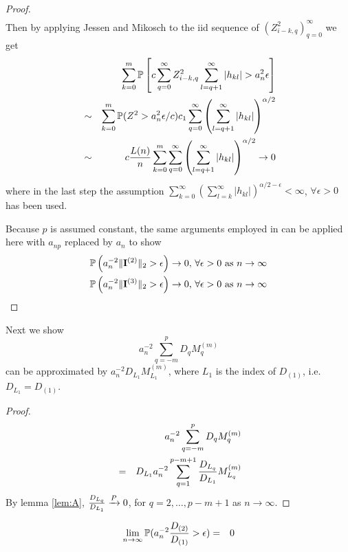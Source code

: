 \documentclass{article}
\begin{document}
\begin{proof}
\begin{eqnarray*}
  \end{eqnarray*}
  Then by applying Jessen and Mikosch \cite{JessenMikosch2006} to the
  iid sequence of $(Z_{i-k, q}^2)_{q=0}^{\infty}$ we get
  \begin{eqnarray*}
    && \sum_{k=0}^m \mathbb{P}\left[c \sum_{q=0}^{\infty} Z_{i-k, q}^2
      \sum_{l=q+1}^\infty |h_{kl}| > a_n^2 \epsilon \right] \\
    &\sim& \sum_{k=0}^m \mathbb{P}(Z^2 > a_n^2 \epsilon/c) c_1
    \sum_{q=0}^{\infty} \left( \sum_{l=q+1}^\infty |h_{kl}|
    \right)^{\alpha/2} \\
    &\sim& c {L(n) \over n} \sum_{k=0}^m \sum_{q=0}^{\infty} \left(
      \sum_{l=q+1}^\infty |h_{kl}| \right)^{\alpha/2} \to 0
  \end{eqnarray*}
  where in the last step the assumption $\sum_{k=0}^{\infty}
  \left(\sum_{l=k}^{\infty} |h_{kl}|\right)^{\alpha/2-\epsilon} <
  \infty$, $\forall \epsilon > 0$ has been used.

  Because $p$ is assumed constant, the same arguments employed in
  \cite{Mikosch2014} can be applied here with $a_{np}$ replaced by
  $a_n$ to show
  \begin{eqnarray*}
    & \mathbb{P}\left(
      a_n^{-2} \|\mathbf{I}^{(2)}\|_2 > \epsilon
    \right) \to 0 \text{, } \forall \epsilon > 0 \text{ as } n \to
    \infty \\
    & \mathbb{P}\left(
      a_n^{-2} \|\mathbf{I}^{(3)}\|_2 > \epsilon
    \right) \to 0 \text{, } \forall \epsilon > 0 \text{ as } n \to \infty
  \end{eqnarray*}
\end{proof}
Next we show
\[
a_n^{-2}\sum_{q=-m}^p D_q M_q^{(m)}
\]
can be approximated by $a_n^{-2} D_{L_1} M_{L_1}^{(m)}$, where $L_1$ is the
index of $D_{(1)}$, i.e. $D_{L_1} = D_{(1)}$.
\begin{proof}
  \begin{eqnarray*}
    && a_n^{-2} \sum_{q=-m}^p D_q M_q^{(m)} \\
    &=& D_{L_1} a_n^{-2} \sum_{q=1}^{p-m+1} {D_{L_q} \over D_{L_1}}
    M_{L_q}^{(m)}
  \end{eqnarray*}
  By lemma \ref{lem:A}, ${D_{L_q} \over D_{L_1}} \xrightarrow{P} 0$,
  for $q = 2, \dots, p-m+1$ as $n \to \infty$.
\end{proof}
\begin{lemma}\label{lem:A}
  \begin{eqnarray*}
    \lim_{n \to \infty} \mathbb{P}(a_n^{-2} {D_{(2)} \over D_{(1)}} >
    \epsilon) &=& 0
  \end{eqnarray*}
\end{lemma}
\end{document}

